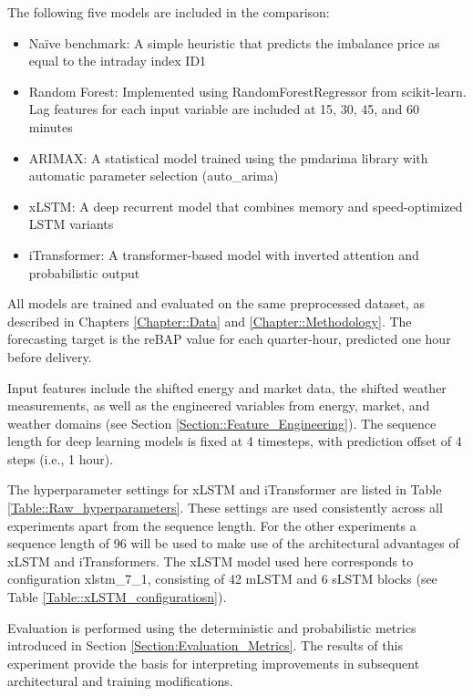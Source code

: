 \documentclass[class=scrbook, crop=false]{standalone}
\begin{document}
The following five models are included in the comparison:
\begin{itemize}
\item Naïve benchmark: A simple heuristic that predicts the imbalance price as equal to the intraday index ID1
\item Random Forest: Implemented using RandomForestRegressor from scikit-learn. Lag features for each input variable are included at 15, 30, 45, and 60 minutes
\item ARIMAX: A statistical model trained using the pmdarima library with automatic parameter selection (auto\_arima)
\item xLSTM: A deep recurrent model that combines memory and speed-optimized LSTM variants
\item iTransformer: A transformer-based model with inverted attention and probabilistic output
\end{itemize}

All models are trained and evaluated on the same preprocessed dataset, as described in Chapters \ref{Chapter::Data} and \ref{Chapter::Methodology}. The forecasting target is the reBAP value for each quarter-hour, predicted one hour before delivery.

Input features include the shifted energy and market data, the shifted weather measurements, as well as the engineered variables from energy, market, and weather domains (see Section \ref{Section::Feature_Engineering}). The sequence length for deep learning models is fixed at 4 timesteps, with prediction offset of 4 steps (i.e., 1 hour).

The hyperparameter settings for xLSTM and iTransformer are listed in Table \ref{Table::Raw_hyperparameters}. These settings are used consistently across all experiments apart from the sequence length. For the other experiments a sequence length of 96 will be used to make use of the architectural advantages of xLSTM and iTransformers. The xLSTM model used here corresponds to configuration xlstm\_7\_1, consisting of 42 mLSTM and 6 sLSTM blocks (see Table \ref{Table::xLSTM_configuratiosn}). 

Evaluation is performed using the deterministic and probabilistic metrics introduced in Section \ref{Section:Evaluation_Metrics}. The results of this experiment provide the basis for interpreting improvements in subsequent architectural and training modifications.

\end{document}
